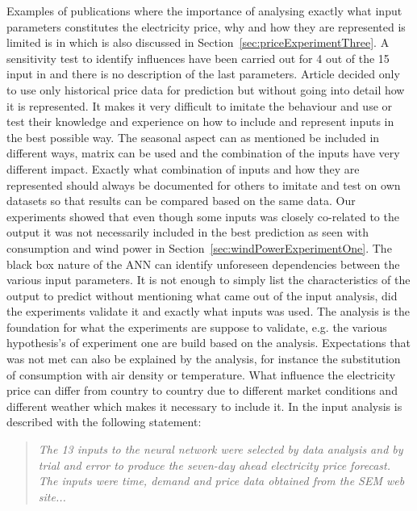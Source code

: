 Examples of publications where the importance of analysing exactly what input parameters constitutes the electricity price, why and how they are represented is limited is in\cite{szkuta1999electricity,sansom1999neural,1} which is also discussed in Section~\ref{sec:priceExperimentThree}. A sensitivity test to identify influences have been carried out for 4 out of the 15 input in \citep{szkuta1999electricity} and there is no description of the last parameters. Article \cite{1} decided only to use only historical price data for prediction but without going into detail how it is represented. It makes it very difficult to imitate the behaviour and use or test their knowledge and experience on how to include and represent inputs in the best possible way. The seasonal aspect can as mentioned be included in different ways, matrix can be used and the combination of the inputs have very different impact. Exactly what combination of inputs and how they are represented should always be documented for others to imitate and test on own datasets so that results can be compared based on the same data. Our experiments showed that even though some inputs was closely co-related to the output it was not necessarily included in the best prediction as seen with consumption and wind power in Section~\ref{sec:windPowerExperimentOne}. The black box nature of the ANN can identify unforeseen dependencies between the various input parameters. It is not enough to simply list the characteristics of the output to predict without mentioning what came out of the input analysis, did the experiments validate it and exactly what inputs was used. The analysis is the foundation for what the experiments are suppose to validate, e.g. the various hypothesis's of experiment one are build based on the analysis. Expectations that was not met can also be explained by the analysis, for instance the substitution of consumption with air density or temperature. What influence the electricity price can differ from country to country due to different market conditions and different weather which makes it necessary to include it. In \cite{sansom1999neural} the input analysis is described with the following statement:

\begin{quotation}
\textit{The 13 inputs to the neural network were selected by data analysis and by trial and error to produce the seven-day ahead electricity price forecast. The inputs were time, demand and price data obtained from the SEM web site...}
\end{quotation}

